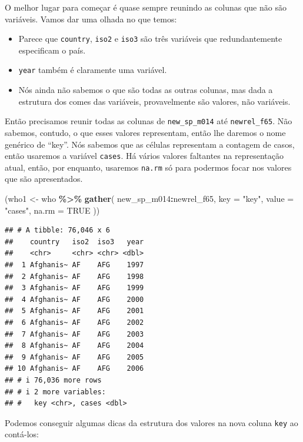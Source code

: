 \documentclass[
]{latex/krantz}
\newenvironment{Shaded}{\begin{snugshade}}{\end{snugshade}}
\newcommand{\AttributeTok}[1]{\textcolor[rgb]{0.13,0.29,0.53}{#1}}
\newcommand{\ConstantTok}[1]{\textcolor[rgb]{0.56,0.35,0.01}{#1}}
\newcommand{\FunctionTok}[1]{\textcolor[rgb]{0.13,0.29,0.53}{\textbf{#1}}}
\newcommand{\NormalTok}[1]{#1}
\newcommand{\OtherTok}[1]{\textcolor[rgb]{0.56,0.35,0.01}{#1}}
\newcommand{\SpecialCharTok}[1]{\textcolor[rgb]{0.81,0.36,0.00}{\textbf{#1}}}
\newcommand{\StringTok}[1]{\textcolor[rgb]{0.31,0.60,0.02}{#1}}
\providecommand{\tightlist}{%
  \setlength{\itemsep}{0pt}\setlength{\parskip}{0pt}}
\theoremstyle{definition}
\theoremstyle{definition}
\theoremstyle{definition}
\theoremstyle{definition}
\theoremstyle{remark}
\begin{document}
O melhor lugar para começar é quase sempre reunindo as colunas que não são variáveis. Vamos dar uma olhada no que temos:

\begin{itemize}
\tightlist
\item
  Parece que \texttt{country}, \texttt{iso2} e \texttt{iso3} são três variáveis que redundantemente especificam o país.
\item
  \texttt{year} também é claramente uma variável.
\item
  Nós ainda não sabemos o que são todas as outras colunas, mas dada a estrutura dos comes das variáveis, provavelmente são valores, não variáveis.
\end{itemize}

Então precisamos reunir todas as colunas de \texttt{new\_sp\_m014} até \texttt{newrel\_f65}. Não sabemos, contudo, o que esses valores representam, então lhe daremos o nome genérico de ``key''. Nós sabemos que as células representam a contagem de casos, então usaremos a variável \texttt{cases}. Há vários valores faltantes na representação atual, então, por enquanto, usaremos \texttt{na.rm} só para podermos focar nos valores que são apresentados.

\begin{Shaded}
\begin{Highlighting}[]
\NormalTok{(who1 }\OtherTok{\textless{}{-}}\NormalTok{ who }\SpecialCharTok{\%\textgreater{}\%}
  \FunctionTok{gather}\NormalTok{(}
\NormalTok{    new\_sp\_m014}\SpecialCharTok{:}\NormalTok{newrel\_f65,}
    \AttributeTok{key =} \StringTok{"key"}\NormalTok{,}
    \AttributeTok{value =} \StringTok{"cases"}\NormalTok{,}
    \AttributeTok{na.rm =} \ConstantTok{TRUE}
\NormalTok{  ))}
\end{Highlighting}
\end{Shaded}

\begin{verbatim}
## # A tibble: 76,046 x 6
##    country   iso2  iso3   year
##    <chr>     <chr> <chr> <dbl>
##  1 Afghanis~ AF    AFG    1997
##  2 Afghanis~ AF    AFG    1998
##  3 Afghanis~ AF    AFG    1999
##  4 Afghanis~ AF    AFG    2000
##  5 Afghanis~ AF    AFG    2001
##  6 Afghanis~ AF    AFG    2002
##  7 Afghanis~ AF    AFG    2003
##  8 Afghanis~ AF    AFG    2004
##  9 Afghanis~ AF    AFG    2005
## 10 Afghanis~ AF    AFG    2006
## # i 76,036 more rows
## # i 2 more variables:
## #   key <chr>, cases <dbl>
\end{verbatim}

Podemos conseguir algumas dicas da estrutura dos valores na nova coluna \texttt{key} ao contá-los:
\end{document}
